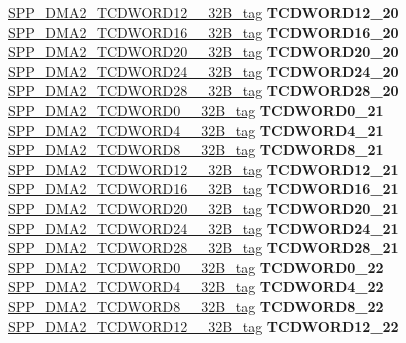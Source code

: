 \begin{DoxyCompactItemize}
\begin{tabbing}
\>\>\mbox{\hyperlink{unionSPP__DMA2__TCDWORD12____32B__tag}{SPP\_DMA2\_TCDWORD12\_\_32B\_tag}} {\bfseries TCDWORD12\_20}\\
\>\>\mbox{\hyperlink{unionSPP__DMA2__TCDWORD16____32B__tag}{SPP\_DMA2\_TCDWORD16\_\_32B\_tag}} {\bfseries TCDWORD16\_20}\\
\>\>\mbox{\hyperlink{unionSPP__DMA2__TCDWORD20____32B__tag}{SPP\_DMA2\_TCDWORD20\_\_32B\_tag}} {\bfseries TCDWORD20\_20}\\
\>\>\mbox{\hyperlink{unionSPP__DMA2__TCDWORD24____32B__tag}{SPP\_DMA2\_TCDWORD24\_\_32B\_tag}} {\bfseries TCDWORD24\_20}\\
\>\>\mbox{\hyperlink{unionSPP__DMA2__TCDWORD28____32B__tag}{SPP\_DMA2\_TCDWORD28\_\_32B\_tag}} {\bfseries TCDWORD28\_20}\\
\>\>\mbox{\hyperlink{unionSPP__DMA2__TCDWORD0____32B__tag}{SPP\_DMA2\_TCDWORD0\_\_32B\_tag}} {\bfseries TCDWORD0\_21}\\
\>\>\mbox{\hyperlink{unionSPP__DMA2__TCDWORD4____32B__tag}{SPP\_DMA2\_TCDWORD4\_\_32B\_tag}} {\bfseries TCDWORD4\_21}\\
\>\>\mbox{\hyperlink{unionSPP__DMA2__TCDWORD8____32B__tag}{SPP\_DMA2\_TCDWORD8\_\_32B\_tag}} {\bfseries TCDWORD8\_21}\\
\>\>\mbox{\hyperlink{unionSPP__DMA2__TCDWORD12____32B__tag}{SPP\_DMA2\_TCDWORD12\_\_32B\_tag}} {\bfseries TCDWORD12\_21}\\
\>\>\mbox{\hyperlink{unionSPP__DMA2__TCDWORD16____32B__tag}{SPP\_DMA2\_TCDWORD16\_\_32B\_tag}} {\bfseries TCDWORD16\_21}\\
\>\>\mbox{\hyperlink{unionSPP__DMA2__TCDWORD20____32B__tag}{SPP\_DMA2\_TCDWORD20\_\_32B\_tag}} {\bfseries TCDWORD20\_21}\\
\>\>\mbox{\hyperlink{unionSPP__DMA2__TCDWORD24____32B__tag}{SPP\_DMA2\_TCDWORD24\_\_32B\_tag}} {\bfseries TCDWORD24\_21}\\
\>\>\mbox{\hyperlink{unionSPP__DMA2__TCDWORD28____32B__tag}{SPP\_DMA2\_TCDWORD28\_\_32B\_tag}} {\bfseries TCDWORD28\_21}\\
\>\>\mbox{\hyperlink{unionSPP__DMA2__TCDWORD0____32B__tag}{SPP\_DMA2\_TCDWORD0\_\_32B\_tag}} {\bfseries TCDWORD0\_22}\\
\>\>\mbox{\hyperlink{unionSPP__DMA2__TCDWORD4____32B__tag}{SPP\_DMA2\_TCDWORD4\_\_32B\_tag}} {\bfseries TCDWORD4\_22}\\
\>\>\mbox{\hyperlink{unionSPP__DMA2__TCDWORD8____32B__tag}{SPP\_DMA2\_TCDWORD8\_\_32B\_tag}} {\bfseries TCDWORD8\_22}\\
\>\>\mbox{\hyperlink{unionSPP__DMA2__TCDWORD12____32B__tag}{SPP\_DMA2\_TCDWORD12\_\_32B\_tag}} {\bfseries TCDWORD12\_22}\\

\end{tabbing}
\end{DoxyCompactItemize}
